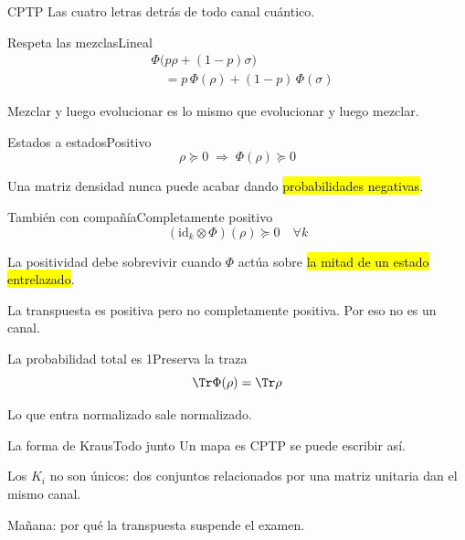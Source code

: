 \documentclass[12pt]{beamer}
\begin{document}
  {CPTP}
  {Las cuatro letras detrás de todo canal cuántico.}

\begin{frame}{Respeta las mezclas}{Lineal}
{\LARGE
\begin{align*}
  &\Phi\big(p\rho + (1-p)\sigma\big)\\
  &\quad= p\,\Phi(\rho) + (1-p)\,\Phi(\sigma)
\end{align*}}%
{\large Mezclar y luego evolucionar es lo mismo que evolucionar y luego mezclar.\par}
\end{frame}

\begin{frame}{Estados a estados}{Positivo}
{\huge
\[
  \rho \succeq 0 \;\Longrightarrow\; \Phi(\rho) \succeq 0
\]}%
{\large Una matriz densidad nunca puede acabar dando \hl{probabilidades negativas}.\par}
\end{frame}

\begin{frame}{También con compañía}{Completamente positivo}
{\huge
\[
  (\mathrm{id}_k \otimes \Phi)(\rho) \succeq 0 \quad \forall k
\]}%
{\large La positividad debe sobrevivir cuando $\Phi$ actúa sobre \hl{la mitad
de un estado entrelazado}.\par}
\begin{notebox}
La transpuesta es positiva pero no completamente positiva. Por eso no es un
canal.
\end{notebox}
\end{frame}

\begin{frame}{La probabilidad total es 1}{Preserva la traza}
{\huge
\[
  \Tr \Phi(\rho) = \Tr \rho
\]}%
{\large Lo que entra normalizado sale normalizado.\par}
\end{frame}

\begin{frame}{La forma de Kraus}{Todo junto}
Un mapa es CPTP  se puede escribir así.
\begin{defbox}
Los $K_i$ no son únicos: dos conjuntos relacionados por una matriz unitaria
dan el mismo canal.
\end{defbox}
\end{frame}

  {Mañana: por qué la transpuesta suspende el examen.}
\end{document}
